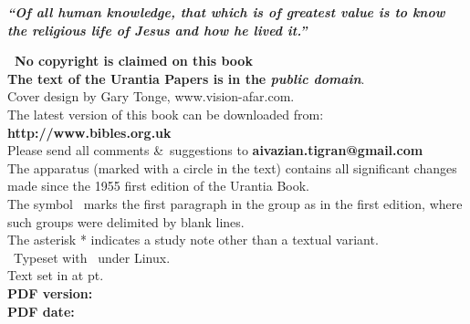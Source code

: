 \begin{center}
\begin{center}\parbox{7cm}{\bfseries\itshape ``Of all human knowledge, that which is of greatest value is to know the religious life of Jesus and how he lived it.'' }\end{center}
\parbox{0.9\linewidth}{\centering
\textbf{\upshape\nocopyright\ No copyright is claimed on this book \serpimolot\\
The text of the Urantia Papers is in the \itshape public domain}.\\[5pt]
Cover design by Gary Tonge, www.vision-afar.com.\\
The latest version of this book can be downloaded from:\\
{\upshape\bfseries http://www.bibles.org.uk}\\
Please send all comments \&\ suggestions to {\makeatletter\upshape\bfseries aivazian.tigran@gmail.com\makeatother}\\
The apparatus (marked with a circle in the text) contains all significant changes made since the 1955 first edition of the Urantia Book.\\
The symbol \pc\ marks the first paragraph in the group as in the first edition, where such groups were delimited by blank lines.\\
The asterisk * indicates a study note other than a textual variant.\\[5pt]
\tux\ Typeset with \XeLaTeX\ under Linux.\\
Text set in \textbf{\urantiamainfont} at \urantiamainfontsize pt.\\[18pt]
\upshape\small\bfseries PDF version: \\
\upshape\small\bfseries PDF date: \mytoday{}\\
}
\end{center}

